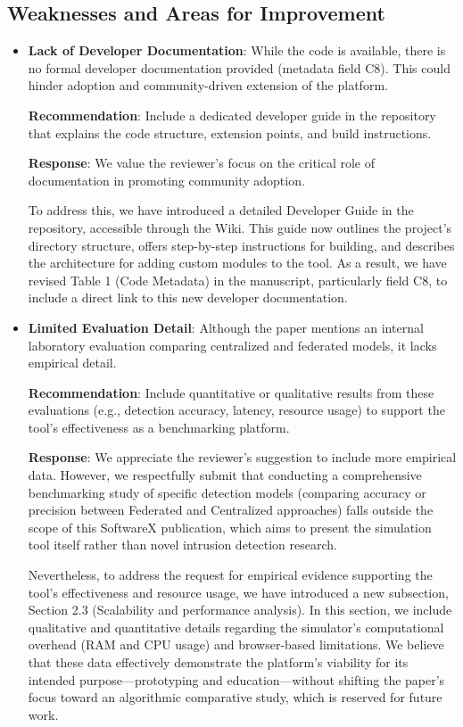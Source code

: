 \documentclass[12pt, a4paper]{article}
\begin{document}
\subsection*{Weaknesses and Areas for Improvement}
\begin{itemize}
    \item \textbf{Lack of Developer Documentation}: While the code is available, there is no formal developer documentation provided (metadata field C8). This could hinder adoption and community-driven extension of the platform.
    
    \textbf{Recommendation}: Include a dedicated developer guide in the repository that explains the code structure, extension points, and build instructions.

    {\color{blue}
        \textbf{Response}: We value the reviewer's focus on the critical role of documentation in promoting community adoption.
        
        To address this, we have introduced a detailed Developer Guide in the repository, accessible through the Wiki. This guide now outlines the project's directory structure, offers step-by-step instructions for building, and describes the architecture for adding custom modules to the tool. As a result, we have revised Table 1 (Code Metadata) in the manuscript, particularly field C8, to include a direct link to this new developer documentation.
    }
    
    \item \textbf{Limited Evaluation Detail}: Although the paper mentions an internal laboratory evaluation comparing centralized and federated models, it lacks empirical detail.
    
    \textbf{Recommendation}: Include quantitative or qualitative results from these evaluations (e.g., detection accuracy, latency, resource usage) to support the tool's effectiveness as a benchmarking platform.

    {\color{blue}
        \textbf{Response}: We appreciate the reviewer's suggestion to include more empirical data. However, we respectfully submit that conducting a comprehensive benchmarking study of specific detection models (comparing accuracy or precision between Federated and Centralized approaches) falls outside the scope of this SoftwareX publication, which aims to present the simulation tool itself rather than novel intrusion detection research.

        Nevertheless, to address the request for empirical evidence supporting the tool's effectiveness and resource usage, we have introduced a new subsection, Section 2.3 (Scalability and performance analysis). In this section, we include qualitative and quantitative details regarding the simulator’s computational overhead (RAM and CPU usage) and browser-based limitations. We believe that these data effectively demonstrate the platform's viability for its intended purpose—prototyping and education—without shifting the paper's focus toward an algorithmic comparative study, which is reserved for future work.
    }
    

\end{itemize}
\end{document}
